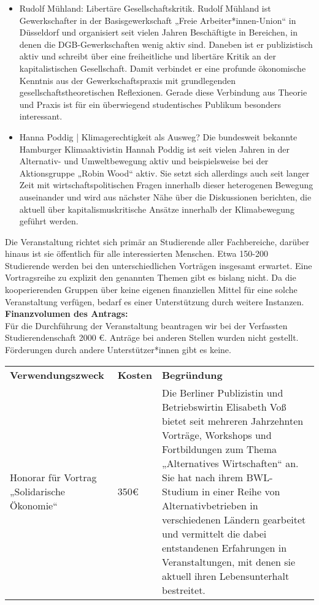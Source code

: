 {\begin{itemize}
        \item Rudolf Mühland: Libertäre Gesellschaftskritik. Rudolf Mühland ist Gewerkschafter in der Basisgewerkschaft „Freie Arbeiter*innen-Union“ in Düsseldorf und organisiert seit vielen Jahren Beschäftigte in Bereichen, in denen die DGB-Gewerkschaften wenig aktiv sind. Daneben ist er publizistisch aktiv und schreibt über eine freiheitliche und libertäre Kritik an der kapitalistischen Gesellschaft. Damit verbindet er eine profunde ökonomische Kenntnis aus der Gewerkschaftspraxis mit grundlegenden gesellschaftstheoretischen Reflexionen. Gerade diese Verbindung aus Theorie und Praxis ist für ein überwiegend studentisches Publikum besonders interessant.
        \item Hanna Poddig | Klimagerechtigkeit als Ausweg? Die bundesweit bekannte Hamburger Klimaaktivistin Hannah Poddig ist seit vielen Jahren in der Alternativ- und Umweltbewegung aktiv und beispielsweise bei der Aktionsgruppe „Robin Wood“ aktiv. Sie setzt sich allerdings auch seit langer Zeit mit wirtschaftspolitischen Fragen innerhalb dieser heterogenen Bewegung auseinander und wird aus nächster Nähe über die Diskussionen berichten, die aktuell über kapitalismuskritische Ansätze innerhalb der Klimabewegung geführt werden.
    \end{itemize}
    Die Veranstaltung richtet sich primär an Studierende aller Fachbereiche, darüber hinaus ist sie öffentlich für alle interessierten Menschen. Etwa 150-200 Studierende werden bei den unterschiedlichen Vorträgen insgesamt erwartet. Eine Vortragsreihe zu explizit den genannten Themen gibt es bislang nicht. Da die kooperierenden Gruppen über keine eigenen finanziellen Mittel für eine solche Veranstaltung verfügen, bedarf es einer Unterstützung durch weitere Instanzen.\\[1em]
    \textbf{Finanzvolumen des Antrags:}\\
    Für die Durchführung der Veranstaltung beantragen wir bei der Verfassten Studierendenschaft 2000 €. Anträge bei anderen Stellen wurden nicht gestellt. Förderungen durch andere Unterstützer*innen gibt es keine.\\
    \begin{longtable}{p{3cm} p{1cm} p{11cm}}
        \endfirsthead
        \endhead
        \endfoot
        \endlastfoot
        \textbf{Verwendungszweck} & \textbf{Kosten} & \textbf{Begründung} \\
        Honorar für Vortrag „Solidarische Ökonomie“ & 350€ & Die Berliner Publizistin und Betriebswirtin Elisabeth Voß bietet seit mehreren Jahrzehnten Vorträge, Workshops und Fortbildungen zum Thema „Alternatives Wirtschaften“ an. Sie hat nach ihrem BWL-Studium in einer Reihe von Alternativbetrieben in verschiedenen Ländern gearbeitet und vermittelt die dabei entstandenen Erfahrungen in Veranstaltungen, mit denen sie aktuell ihren Lebensunterhalt bestreitet.\\

\end{longtable}}
